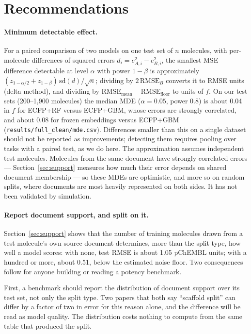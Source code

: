 \section{Recommendations}\label{sec:recs}
\paragraph{Minimum detectable effect.}
For a paired comparison of two models on one test set of $n$ molecules, with per-molecule differences of squared errors $d_i=e_{A,i}^2-e_{B,i}^2$, the smallest MSE difference detectable at level $\alpha$ with power $1-\beta$ is approximately $(z_{1-\alpha/2}+z_{1-\beta})\,\mathrm{sd}(d)/\sqrt{n}$; dividing by $2\,\mathrm{RMSE}_B$ converts it to RMSE units (delta method), and dividing by $\mathrm{RMSE}_{\text{mean}}-\mathrm{RMSE}_{\text{floor}}$ to units of $f$. On our test sets (200--1{,}900 molecules) the median MDE ($\alpha=0.05$, power 0.8) is about 0.04 in $f$ for ECFP+RF versus ECFP+GBM, whose errors are strongly correlated, and about 0.08 for frozen embeddings versus ECFP+GBM (\texttt{results/full\_clean/mde.csv}). Differences smaller than this on a single dataset should not be reported as improvements; detecting them requires pooling over tasks with a paired test, as we do here. The approximation assumes independent test molecules. Molecules from the same document have strongly correlated errors --- Section~\ref{sec:support} measures how much their error depends on shared document membership --- so these MDEs are optimistic, and more so on random splits, where documents are most heavily represented on both sides. It has not been validated by simulation.

\paragraph{Report document support, and split on it.}
Section~\ref{sec:support} shows that the number of training molecules drawn from a test molecule's own source document determines, more than the split type, how well a model scores: with none, test RMSE is about 1.05 pChEMBL units; with a hundred or more, about 0.51, below the estimated noise floor. Two consequences follow for anyone building or reading a potency benchmark.

First, a benchmark should report the distribution of document support over its test set, not only the split type. Two papers that both say ``scaffold split'' can differ by a factor of two in error for this reason alone, and the difference will be read as model quality. The distribution costs nothing to compute from the same table that produced the split.

